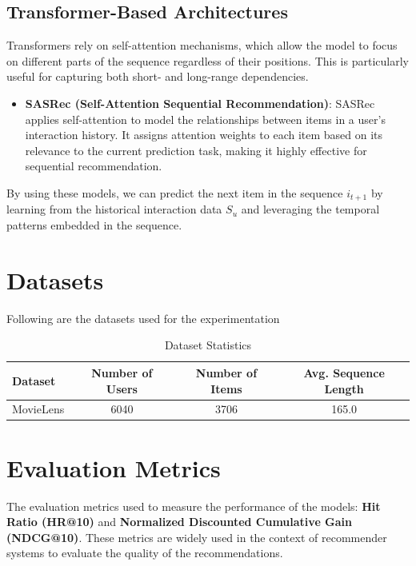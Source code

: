 \documentclass{article}
\begin{document}
\subsection{Transformer-Based Architectures}
Transformers rely on self-attention mechanisms, which allow the model to focus on different parts of the sequence regardless of their positions. This is particularly useful for capturing both short- and long-range dependencies.

\begin{itemize}
    \item \textbf{SASRec (Self-Attention Sequential Recommendation)}: SASRec applies self-attention to model the relationships between items in a user's interaction history. It assigns attention weights to each item based on its relevance to the current prediction task, making it highly effective for sequential recommendation.
\end{itemize}

By using these models, we can predict the next item in the sequence \( i_{t+1} \) by learning from the historical interaction data \( S_u \) and leveraging the temporal patterns embedded in the sequence.

\newpage

\section{Datasets}

Following are the datasets used for the experimentation 
\begin{table}[htbp]
\centering
\caption{Dataset Statistics}
\begin{tabular}{|l|c|c|c|}
\hline
\textbf{Dataset} & \textbf{Number of Users} & \textbf{Number of Items} & \textbf{Avg. Sequence Length} \\ \hline
MovieLens        & 6040                 & 3706                 & 165.0                         \\ \hline

\end{tabular}
\end{table}

\section{Evaluation Metrics}

The evaluation metrics used to measure the performance of the models: \textbf{Hit Ratio (HR@10)} and \textbf{Normalized Discounted Cumulative Gain (NDCG@10)}. These metrics are widely used in the context of recommender systems to evaluate the quality of the recommendations.
\end{document}
